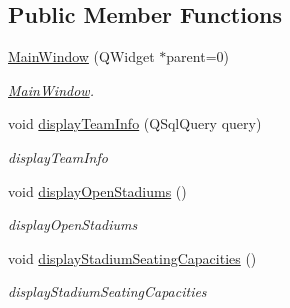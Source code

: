 \subsection*{Public Member Functions}
\begin{DoxyCompactItemize}
\item 
\hyperlink{class_main_window_a8b244be8b7b7db1b08de2a2acb9409db}{Main\+Window} (Q\+Widget $\ast$parent=0)
\begin{DoxyCompactList}\small\item\em \hyperlink{class_main_window}{Main\+Window}. \end{DoxyCompactList}\item 
void \hyperlink{class_main_window_a65071d7a414765292d760181c3d72eff}{display\+Team\+Info} (Q\+Sql\+Query query)
\begin{DoxyCompactList}\small\item\em display\+Team\+Info \end{DoxyCompactList}\item 
\mbox{\label{class_main_window_a93e72d8e127526817e7ad2ede58b392d}} 
void \hyperlink{class_main_window_a93e72d8e127526817e7ad2ede58b392d}{display\+Open\+Stadiums} ()
\begin{DoxyCompactList}\small\item\em display\+Open\+Stadiums \end{DoxyCompactList}\item 
\mbox{\label{class_main_window_a9a8bb71cb7637bfd25c19988d3f67300}} 
void \hyperlink{class_main_window_a9a8bb71cb7637bfd25c19988d3f67300}{display\+Stadium\+Seating\+Capacities} ()
\begin{DoxyCompactList}\small\item\em display\+Stadium\+Seating\+Capacities \end{DoxyCompactList}\end{DoxyCompactItemize}
